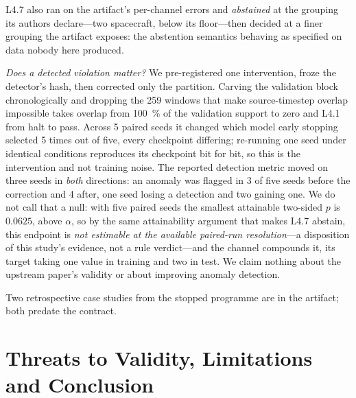 \documentclass[conference]{IEEEtran}
\newcommand{\rulename}[1]{\textsf{#1}}
\newcommand{\artv}[2]{#2}
\begin{document}
\rulename{L4.7} also ran on the artifact's per-channel errors and \emph{abstained} at the grouping
its authors declare---two spacecraft, below its floor---then decided at a finer grouping the
artifact exposes: the abstention semantics behaving as specified on data nobody here produced.

\emph{Does a detected violation matter?} We pre-registered one intervention, froze the detector's
hash, then corrected only the partition. Carving the validation block chronologically and dropping
the \num{259} windows that make source-timestep overlap impossible takes overlap from
\qty{\artv{cons_overlap_pct}{100}}{\percent} of the validation support to zero and \rulename{L4.1}
from halt to pass. Across \artv{cons_seeds}{\num{5}} paired seeds it changed which model early
stopping selected \artv{cons_sel_changed}{\num{5}} times out of five, every checkpoint differing;
re-running one seed under identical conditions reproduces its checkpoint bit for bit, so this is the
intervention and not training noise. The reported detection metric moved on three seeds in
\emph{both} directions: an anomaly was flagged in \artv{cons_det_orig}{3} of five seeds before the
correction and \artv{cons_det_corr}{4} after, one seed losing a detection and two gaining one. We do not call that a null: with five paired seeds the smallest attainable
two-sided $p$ is $\artv{cons_minp}{0.0625}$, above $\alpha$, so by the same attainability argument
that makes \rulename{L4.7} abstain, this endpoint is \emph{not estimable at the available paired-run
resolution}---a disposition of this study's evidence, not a rule verdict---and the channel compounds
it, its target taking one value in training and two in test. We claim nothing about the upstream paper's
validity or about improving anomaly detection.

Two retrospective case studies from the stopped programme are in the artifact; both predate the
contract.

\section{Threats to Validity, Limitations and Conclusion}
\label{sec:threats}
\end{document}
